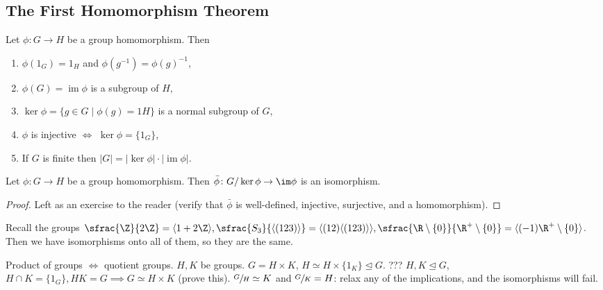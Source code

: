 \subsection{The First Homomorphism Theorem}
\begin{remark}
    Let $ \phi \colon G \to H$ be a group homomorphism. Then
    \begin{enumerate}
        \item $\phi(1_G)=1_H$ and $\phi(g^{-1})=\phi(g)^{-1}$,
        \item $\phi(G) = \operatorname{im}\phi$ is a subgroup of $H$,
        \item $\ker \phi = \{g\in G \mid \phi(g)=1 H\} $ is a normal subgroup of $G$,
        \item $\phi$ is injective $\iff$ $\ker \phi = \{1_G\}$,
        \item If $G$ is finite then $|G|=|\ker \phi|\cdot |\operatorname{im} \phi|$.
    \end{enumerate}
\end{remark}
\begin{theorem}
    Let $ \phi \colon G \to H$ be a group homomorphism. Then $\bar{\phi} \colon G/\ker\phi \to \im \phi$ is an isomorphism.
\end{theorem}
\begin{proof}
    Left as an exercise to the reader (verify that $\bar{\phi}$ is well-defined, injective, surjective, and a homomorphism).
\end{proof}
\begin{example}
    Recall the groups $\sfrac{\Z}{2\Z} = \langle 1+2\Z \rangle, \sfrac{S_3}{\langle (123) \rangle} = \langle (12)\langle (123) \rangle  \rangle, \sfrac{\R\setminus \{0\} }{\R^{+}\setminus \{0\} } = \langle (-1)\R^{+}\setminus \{0\}  \rangle $. Then we have isomorphisms onto all of them, so they are the same.
\end{example}
\begin{remark}
    Product of groups $\iff$ quotient groups. $H, K$ be groups. 
    $G=H\times K$, $H \simeq H \times \{1_K\} \trianglelefteq G$. ???
    $H,K \trianglelefteq G$, $H \cap K = \{1_G\} , HK=G \implies G \simeq H \times K$ (prove this). $\sfrac{G}{H} \simeq K$ and $\sfrac{G}{K}=H$: relax any of the implications, and the isomorphisms will fail.
\end{remark}

